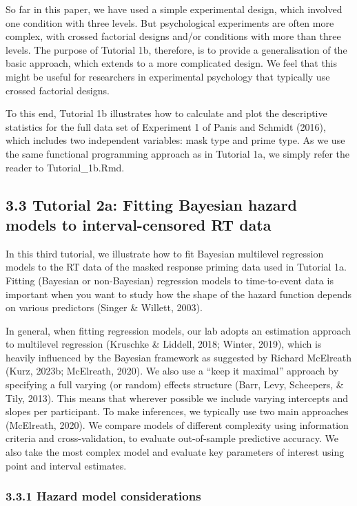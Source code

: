 \documentclass[
  english,
  man, donotrepeattitle,floatsintext]{apa6}
\begin{document}
So far in this paper, we have used a simple experimental design, which involved one condition with three levels. But psychological experiments are often more complex, with crossed factorial designs and/or conditions with more than three levels. The purpose of Tutorial 1b, therefore, is to provide a generalisation of the basic approach, which extends to a more complicated design. We feel that this might be useful for researchers in experimental psychology that typically use crossed factorial designs.

To this end, Tutorial 1b illustrates how to calculate and plot the descriptive statistics for the full data set of Experiment 1 of Panis and Schmidt (2016), which includes two independent variables: mask type and prime type. As we use the same functional programming approach as in Tutorial 1a, we simply refer the reader to Tutorial\_1b.Rmd.

\subsection{3.3 Tutorial 2a: Fitting Bayesian hazard models to interval-censored RT data}\label{tutorial-2a-fitting-bayesian-hazard-models-to-interval-censored-rt-data}

In this third tutorial, we illustrate how to fit Bayesian multilevel regression models to the RT data of the masked response priming data used in Tutorial 1a. Fitting (Bayesian or non-Bayesian) regression models to time-to-event data is important when you want to study how the shape of the hazard function depends on various predictors (Singer \& Willett, 2003).

In general, when fitting regression models, our lab adopts an estimation approach to multilevel regression (Kruschke \& Liddell, 2018; Winter, 2019), which is heavily influenced by the Bayesian framework as suggested by Richard McElreath (Kurz, 2023b; McElreath, 2020). We also use a ``keep it maximal'' approach by specifying a full varying (or random) effects structure (Barr, Levy, Scheepers, \& Tily, 2013). This means that wherever possible we include varying intercepts and slopes per participant.
To make inferences, we typically use two main approaches (McElreath, 2020). We compare models of different complexity using information criteria and cross-validation, to evaluate out-of-sample predictive accuracy. We also take the most complex model and evaluate key parameters of interest using point and interval estimates.

\subsubsection{3.3.1 Hazard model considerations}\label{hazard-model-considerations}
\end{document}
